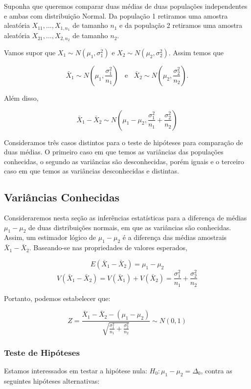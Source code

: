 \documentclass[
]{book}
\begin{document}
Suponha que queremos comparar duas médias de duas populações independentes e ambas com distribuição Normal. Da população 1 retiramos uma amostra aleatória \(X_{11},\ldots,X_{1,n_1}\) de tamanho \(n_1\) e da população 2 retiramos uma amostra aleatória \(X_{21},\ldots,X_{2,n_2}\) de tamanho \(n_2\).

Vamos supor que \(X_1\sim N\left(\mu_1,\sigma^2_1\right)\) e \(X_2\sim N\left(\mu_2,\sigma^2_2\right)\). Assim temos que

\[\bar X_1 \sim N\left(\mu_1,\frac{\sigma^2_1}{n_1}\right)~~~~\text{e}~~~~\bar X_2 \sim N\left(\mu_2,\frac{\sigma^2_2}{n_2}\right).\]

Além disso,

\[\bar X_1 - \bar X_2 \sim N\left(\mu_1-\mu_2,\frac{\sigma^2_1}{n_1}+\frac{\sigma^2_2}{n_2}\right)\]

Consideramos três casos distintos para o teste de hipóteses para comparação de duas médias. O primeiro caso em que temos as variâncias das populações conhecidas, o segundo as variâncias são desconhecidas, porém iguais e o terceiro caso em que temos as variâncias desconhecidas e distintas.

\hypertarget{variuxe2ncias-conhecidas}{%
\subsection{Variâncias Conhecidas}\label{variuxe2ncias-conhecidas}}

Consideraremos nesta seção as inferências estatísticas para a diferença de médias \(\mu_1-\mu_2\) de duas distribuições normais, em que as variâncias são conhecidas. Assim, um estimador lógico de \(\mu_1-\mu_2\) é a diferença das médias amostrais \(\bar X_1-\bar X_2\). Baseando-se nas propriedades de valores esperados,

\[E(\bar X_1-\bar X_2)=\mu_1-\mu_2\]
\[V(\bar X_1-\bar X_2)=V(\bar X_1)+V(\bar X_2)=\frac{\sigma^2_1}{n_1}+\frac{\sigma^2_2}{n_2}\]

Portanto, podemos estabelecer que:

\[Z=\frac{\bar X_1-\bar X_2-(\mu_1-\mu_2)}{\sqrt{\frac{\sigma^2_1}{n_1}+\frac{\sigma^2_2}{n_2}}}\sim N(0,1)\]

\hypertarget{teste-de-hipuxf3teses-1}{%
\subsubsection{Teste de Hipóteses}\label{teste-de-hipuxf3teses-1}}

Estamos interessados em testar a hipótese nula: \(H_0: \mu_1-\mu_2=\Delta_0\), contra as seguintes hipóteses alternativas:
\end{document}
